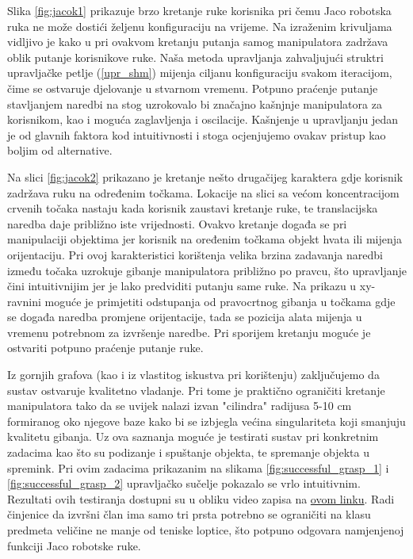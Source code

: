 \documentclass[times, utf8, diplomski, numeric]{fer}
\begin{document}
Slika \ref{fig:jacok1} prikazuje brzo kretanje ruke korisnika pri čemu Jaco robotska ruka ne može dostići željenu konfiguraciju na vrijeme.
Na izraženim krivuljama vidljivo je kako u pri ovakvom kretanju putanja samog manipulatora zadržava oblik putanje korisnikove ruke.
Naša metoda upravljanja zahvaljujući struktri upravljačke petlje (\ref{upr_shm}) mijenja ciljanu konfiguraciju svakom iteracijom, čime se ostvaruje djelovanje u stvarnom vremenu.
Potpuno praćenje putanje stavljanjem naredbi na stog uzrokovalo bi značajno kašnjnje manipulatora za korisnikom, kao i moguća zaglavljenja i oscilacije.
Kašnjenje u upravljanju jedan je od glavnih faktora kod intuitivnosti i stoga ocjenjujemo ovakav pristup kao boljim od alternative.

Na slici \ref{fig:jacok2} prikazano je kretanje nešto drugačijeg karaktera gdje korisnik zadržava ruku na određenim točkama.
Lokacije na slici sa većom koncentracijom crvenih točaka nastaju kada korisnik zaustavi kretanje ruke, te translacijska naredba daje približno iste vrijednosti.
Ovakvo kretanje događa se pri manipulaciji objektima jer korisnik na oređenim točkama objekt hvata ili mijenja orijentaciju.
Pri ovoj karakteristici korištenja velika brzina zadavanja naredbi između točaka uzrokuje gibanje manipulatora približno po pravcu, što upravljanje čini intuitivnijim jer je lako predviditi putanju same ruke. 
Na prikazu u xy-ravnini moguće je primjetiti odstupanja od pravocrtnog gibanja u točkama gdje se događa naredba promjene orijentacije, tada se pozicija alata mijenja u vremenu potrebnom za izvršenje naredbe.
Pri sporijem kretanju moguće je ostvariti potpuno praćenje putanje ruke.

Iz gornjih grafova (kao i iz vlastitog iskustva pri korištenju) zaključujemo da sustav ostvaruje kvalitetno vladanje.
Pri tome je praktično ograničiti kretanje manipulatora tako da se uvijek nalazi izvan "cilindra" radijusa 5-10 cm formiranog oko njegove baze kako bi se izbjegla većina singulariteta koji smanjuju kvalitetu gibanja.
Uz ova saznanja moguće je testirati sustav pri konkretnim zadacima kao što su podizanje i spuštanje objekta, te spremanje objekta u spremink.
Pri ovim zadacima prikazanim na slikama \ref{fig:successful_grasp_1} i \ref{fig:successful_grasp_2} upravljačko sučelje pokazalo se vrlo intuitivnim.
Rezultati ovih testiranja dostupni su u obliku video zapisa na \href{https://youtu.be/exf7TUviuSg}{ovom linku}.
Radi činjenice da izvršni član ima samo tri prsta potrebno se ograničiti na klasu predmeta veličine ne manje od teniske loptice, što potpuno odgovara namjenjenoj funkciji Jaco robotske ruke. 
\end{document}
